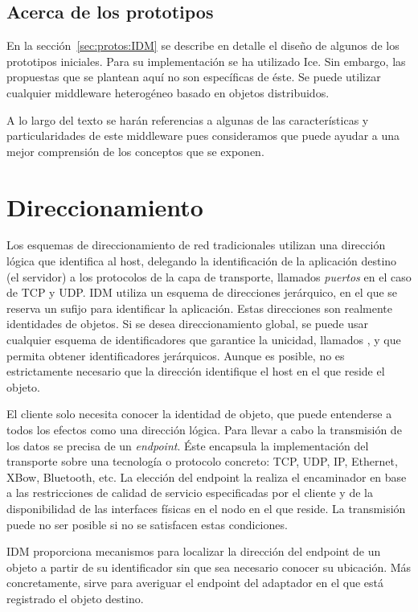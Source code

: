 \documentclass{arco-article}
\newcommand{\fg}[1]{\textit{#1}}
\def \mw {middleware}
\begin{document}
\subsection{Acerca de los prototipos}

En la sección~\ref{sec:protos:IDM} se describe en detalle el diseño de
algunos de los prototipos iniciales.  Para su implementación se ha
utilizado \ac{Ice}. Sin embargo, las propuestas que se plantean aquí
no son específicas de éste. Se puede utilizar cualquier \mw{}
heterogéneo basado en objetos distribuidos.

A lo largo del texto se harán referencias a algunas de las
características y particularidades de este \mw{} pues consideramos que
puede ayudar a una mejor comprensión de los conceptos que se exponen.


\section{Direccionamiento}

Los esquemas de direccionamiento de red tradicionales utilizan una
dirección lógica que identifica al host, delegando la
identificación de la aplicación destino (el servidor) a los protocolos
de la capa de transporte, llamados \emph{puertos} en el caso de
\ac{TCP} y \ac{UDP}.  \ac{IDM} utiliza un esquema de direcciones
jerárquico, en el que se reserva un sufijo para identificar la
aplicación.  Estas direcciones son realmente identidades de objetos.
Si se desea direccionamiento global, se puede usar cualquier esquema
de identificadores que garantice la unicidad, llamados , y
que permita obtener identificadores jerárquicos.  Aunque es posible,
no es estrictamente necesario que la dirección identifique el
host en el que reside el objeto.

El cliente solo necesita conocer la identidad de objeto, que puede
entenderse a todos los efectos como una dirección lógica.  Para llevar
a cabo la transmisión de los datos se precisa de un \fg{endpoint}.
Éste encapsula la implementación del transporte sobre una tecnología o
protocolo concreto: \ac{TCP}, \ac{UDP}, \ac{IP}, Ethernet, \ac{XBow},
Bluetooth, etc.  La elección del endpoint la realiza el
encaminador en base a las restricciones de calidad de servicio
especificadas por el cliente y de la disponibilidad de las interfaces
físicas en el nodo en el que reside.  La transmisión puede no ser
posible si no se satisfacen estas condiciones.

\ac{IDM} proporciona mecanismos para localizar la dirección del
endpoint de un objeto a partir de su identificador sin que sea
necesario conocer su ubicación.  Más concretamente, sirve para
averiguar el endpoint del adaptador en el que está
registrado el objeto destino.
\end{document}
